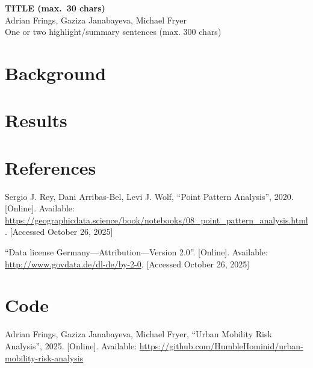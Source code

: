 \documentclass[10pt,a4paper]{article} %
\begin{document}
\begin{center}
    {\large\bfseries TITLE (max.\ 30 chars)}\\[0.5em]
    {\small Adrian Frings, Gaziza Janabayeva, Michael Fryer}\\[1em]
    {\small One or two highlight/summary sentences (max. 300 chars)}
\end{center}


\section*{Background}

\section*{Results}

\section*{References}
\begin{enumerate}[label={[\arabic*]}]
    \item Sergio J. Rey, Dani Arribas-Bel, Levi J. Wolf, ``Point Pattern Analysis'', 2020. [Online]. Available: \url{https://geographicdata.science/book/notebooks/08_point_pattern_analysis.html}. [Accessed October 26, 2025]
    \item ``Data license Germany---Attribution---Version 2.0''. [Online]. Available: \url{http://www.govdata.de/dl-de/by-2-0}. [Accessed October 26, 2025] %
\end{enumerate}

\section*{Code}
\begin{enumerate}[label={[\arabic*]},start=3]
    \item Adrian Frings, Gaziza Janabayeva, Michael Fryer, ``Urban Mobility Risk Analysis'', 2025. [Online]. Available: \url{https://github.com/HumbleHominid/urban-mobility-risk-analysis}
\end{enumerate}
\end{document}
